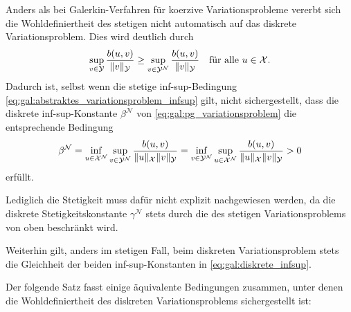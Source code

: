 \begin{Bemerkung}
    \label{bem:gal:zur_wohldefiniertheit}
    Anders als bei Galerkin-Verfahren für koerzive Variationsprobleme vererbt sich die Wohldefiniertheit des stetigen nicht automatisch auf das diskrete Variationsproblem.
    Dies wird deutlich durch
    \begin{equation}
        \sup_{v \in \mathcal Y} \frac{b(u, v)}{\norm{v}_{\mathcal Y}} \geq \sup_{v \in \mathcal Y^{\mathcal N}} \frac{b(u, v)}{\norm{v}_{\mathcal Y}} \quad \fa u \in \mathcal X.
    \end{equation}
    Dadurch ist, selbst wenn die stetige inf-sup-Bedingung \cref{eq:gal:abstraktes_variationsproblem_infsup} gilt, nicht sichergestellt, dass die diskrete inf-sup-Konstante $\beta^{\mathcal N}$ von \cref{eq:gal:pg_variationsproblem} die entsprechende Bedingung
    \begin{equation}
        \label{eq:gal:diskrete_infsup}
        \beta^{\mathcal N} = \inf_{u \in \mathcal X^{\mathcal N}} \sup_{v \in \mathcal Y^{\mathcal N}} \frac{b(u, v)}{\norm{u}_{\mathcal X} \norm{v}_{\mathcal Y}} = \inf_{v \in \mathcal Y^{\mathcal N}} \sup_{u \in \mathcal X^{\mathcal N}} \frac{b(u, v)}{\norm{u}_{\mathcal X} \norm{v}_{\mathcal Y}} > 0
    \end{equation}
    erfüllt.

   Lediglich die Stetigkeit muss dafür nicht explizit nachgewiesen werden, da die diskrete Stetigkeitskonstante $\gamma^{\mathcal N}$ stets durch die des stetigen Variationsproblems von oben beschränkt wird.

   Weiterhin gilt, anders im stetigen Fall, beim diskreten Variationsproblem stets die Gleichheit der beiden inf-sup-Konstanten in \cref{eq:gal:diskrete_infsup}.
\end{Bemerkung}

Der folgende Satz fasst einige äquivalente Bedingungen zusammen, unter denen die Wohldefiniertheit des diskreten Variationsproblems sichergestellt ist:

